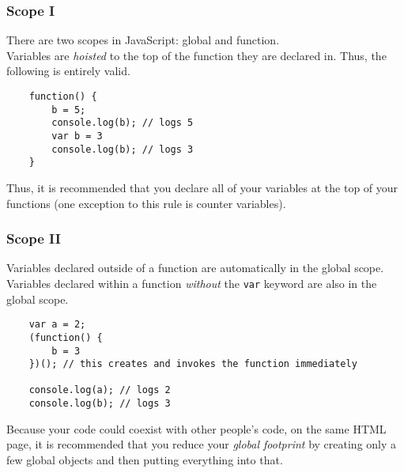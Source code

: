 \documentclass{lug}
\begin{document}
\begin{frame}[fragile]
    \frametitle{Scope I}

    There are two scopes in JavaScript: global and function.\footnotemark[1]\\

    Variables are \textit{hoisted} to the top of the function they are declared in. Thus, the
    following is entirely valid.

    \begin{lstlisting}
    function() {
        b = 5;
        console.log(b); // logs 5
        var b = 3
        console.log(b); // logs 3
    }
    \end{lstlisting}

    Thus, it is recommended that you declare all of your variables at the top of your
    functions (one exception to this rule is counter variables).

\end{frame}

\begin{frame}[fragile]
    \frametitle{Scope II}

    Variables declared outside of a function are automatically in the global scope.\\

    Variables declared within a function \textit{without} the \texttt{var} keyword are also in the
    global scope.

    \begin{lstlisting}
    var a = 2;
    (function() {
        b = 3
    })(); // this creates and invokes the function immediately

    console.log(a); // logs 2
    console.log(b); // logs 3
    \end{lstlisting}

    Because your code could coexist with other people's code, on the same HTML page, it is
    recommended that you reduce your \textit{global footprint} by creating only a few global objects
    and then putting everything into that.
\end{frame}
\end{document}
